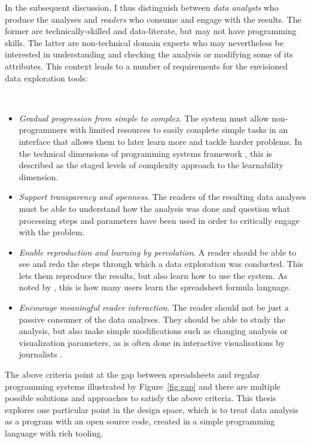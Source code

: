\documentclass[fleqn,11pt]{report}
\theoremstyle{definition}
\newenvironment{nitemize}
{ \vspace{-0.4em}
  \begin{itemize}
    \setlength{\itemsep}{5pt}
    \setlength{\parskip}{0pt}
    \setlength{\parsep}{0pt} }
{ \end{itemize}
  \vspace{-0.4em} }
\begin{document}
In the subsequent discussion, I thus distinguish between \emph{data analysts} who produce the
analyses and \emph{readers} who consume and engage with the results. The former are
technically-skilled and data-literate, but may not have programming skills. The latter are
non-technical domain experts who may nevertheless be interested
in understanding and checking the analysis or modifying some of its attributes.
This context leads to a number of requirements for the envisioned data exploration tools:

~

\begin{nitemize}
\item \emph{Gradual progression from simple to complex}. The system must allow non-program\-mers with
limited resources to easily complete simple tasks in an interface that allows them to later
learn more and tackle harder problems. In the technical dimensions of programming systems
framework \citep{jakubovic-2023-techdims}, this is described as the staged levels of complexity
approach to the learnability dimension.

\item \emph{Support transparency and openness}. The readers of the resulting data analyses must
be able to understand how the analysis was done and question what processing steps and parameters
have been used in order to critically engage with the problem.

\item \emph{Enable reproduction and learning by percolation}. A reader should be able to see and
redo the steps through which a data exploration was conducted. This lets them reproduce the results,
but also learn how to use the system. As noted by \citet{sarkar-2018-spreadsheets}, this is how
many users learn the spreadsheet formula language.

\item \emph{Encourage meaningful reader interaction}. The reader should not be just a passive
consumer of the data analyses. They should be able to study the analysis, but
also make simple modifications such as changing analysis or visualization parameters,
as is often done in interactive visualisations by journalists \citep{kennedy-2021-engagements}.
\end{nitemize}

The above criteria point at the gap between spreadsheets and regular programming systems
illustrated by Figure~\ref{fig:gap} and there are multiple possible solutions and approaches to
satisfy the above criteria. This thesis explores one particular point in the design space,
which is to treat data analysis as a program with an open source code, created in a simple
programming language with rich tooling.
\end{document}
